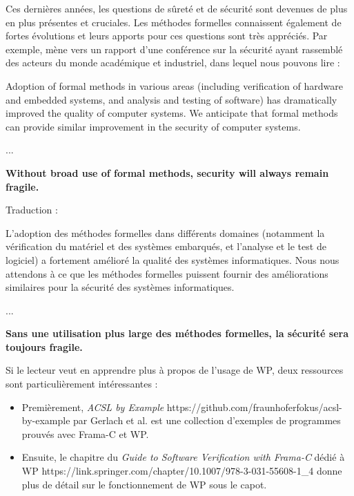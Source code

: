 Ces dernières années, les questions de sûreté et de sécurité sont devenues de
plus en plus présentes et cruciales. Les méthodes formelles connaissent également
de fortes évolutions et leurs apports pour ces questions sont très appréciés.
Par exemple,  mène vers
un rapport d'une conférence sur la sécurité ayant rassemblé des acteurs du monde
académique et industriel, dans lequel nous pouvons lire :



\begin{Quotation}
Adoption of formal methods in various areas (including verification of hardware
and embedded systems, and analysis and testing of software) has dramatically
improved the quality of computer systems.  We anticipate that formal methods
can provide similar improvement in the security of computer systems.

...

\textbf{Without broad use of formal methods, security will always remain fragile.}
\end{Quotation}



\begin{Information}
Traduction :

L'adoption des méthodes formelles dans différents domaines (notamment la
vérification du matériel et des systèmes embarqués, et l'analyse et le test
de logiciel) a fortement amélioré la qualité des systèmes informatiques.
Nous nous attendons à ce que les méthodes formelles puissent fournir des
améliorations similaires pour la sécurité des systèmes informatiques.

...

\textbf{Sans une utilisation plus large des méthodes formelles, la sécurité sera
toujours fragile.}
\end{Information}






Si le lecteur veut en apprendre plus à propos de l'usage de WP, deux ressources
sont particulièrement intéressantes :
\begin{itemize}
\item Premièrement,
      \externalLink
          {\textit{ACSL by Example}}
          {https://github.com/fraunhoferfokus/acsl-by-example}
      par Gerlach et al. est une collection d'exemples de programmes prouvés
      avec Frama-C et WP.
\item Ensuite, le
      \externalLink
          {chapitre du \textit{Guide to Software Verification with Frama-C} dédié à WP}
          {https://link.springer.com/chapter/10.1007/978-3-031-55608-1_4}
      donne plus de détail sur le fonctionnement de WP sous le capot.
\end{itemize}


